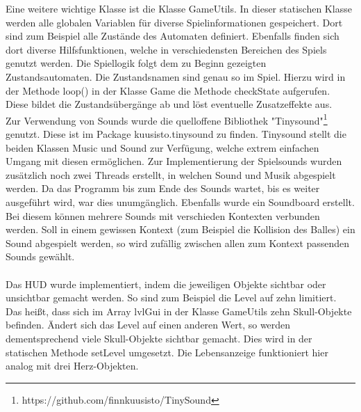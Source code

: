 Eine weitere wichtige Klasse ist die Klasse GameUtils. In dieser statischen Klasse werden alle globalen Variablen für diverse Spielinformationen gespeichert. Dort sind zum Beispiel alle Zustände des Automaten definiert. Ebenfalls finden sich dort diverse Hilfsfunktionen, welche in verschiedensten Bereichen des Spiels genutzt werden. Die Spiellogik folgt dem zu Beginn gezeigten Zustandsautomaten. Die Zustandsnamen sind genau so im Spiel. Hierzu wird in der Methode loop() in der Klasse Game die Methode checkState aufgerufen. Diese bildet die Zustandsübergänge ab und löst eventuelle Zusatzeffekte aus.\\
Zur Verwendung von Sounds wurde die quelloffene Bibliothek "Tinysound"\footnote{https://github.com/finnkuusisto/TinySound} genutzt. Diese ist im Package kuusisto.tinysound zu finden. Tinysound stellt die beiden Klassen Music und Sound zur Verfügung, welche extrem einfachen Umgang mit diesen ermöglichen. Zur Implementierung der Spielsounds wurden zusätzlich noch zwei Threads erstellt, in welchen Sound und Musik abgespielt werden. Da das Programm bis zum Ende des Sounds wartet, bis es weiter ausgeführt wird, war dies unumgänglich. Ebenfalls wurde ein Soundboard erstellt. Bei diesem können mehrere Sounds mit verschieden Kontexten verbunden werden. Soll in einem gewissen Kontext (zum Beispiel die Kollision des Balles) ein Sound abgespielt werden, so wird zufällig zwischen allen zum Kontext passenden Sounds gewählt.\\\\
Das HUD wurde implementiert, indem die jeweiligen Objekte sichtbar oder unsichtbar gemacht werden. So sind zum Beispiel die Level auf zehn limitiert. Das heißt, dass sich im Array lvlGui in der Klasse GameUtils zehn Skull-Objekte befinden. Ändert sich das Level auf einen anderen Wert, so werden dementsprechend viele Skull-Objekte sichtbar gemacht. Dies wird in der statischen Methode setLevel umgesetzt. Die Lebensanzeige funktioniert hier analog mit drei Herz-Objekten.
